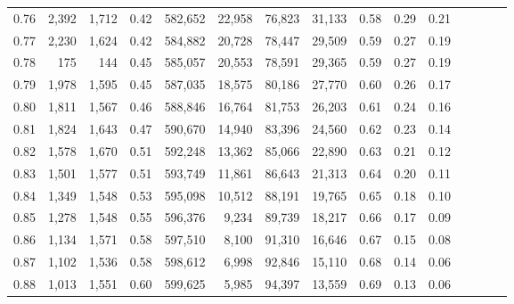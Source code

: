 \begin{tabular}{rrrcrrrrrrrrrrr}
0.76 &   2,392 &  1,712 &                                       0.42 &  582,652 &   22,958 &   76,823 &   31,133 &  0.58 &  0.29 &                         0.21 \\
0.77 &   2,230 &  1,624 &                                       0.42 &  584,882 &   20,728 &   78,447 &   29,509 &  0.59 &  0.27 &                         0.19 \\
0.78 &     175 &    144 &                                       0.45 &  585,057 &   20,553 &   78,591 &   29,365 &  0.59 &  0.27 &                         0.19 \\
0.79 &   1,978 &  1,595 &                                       0.45 &  587,035 &   18,575 &   80,186 &   27,770 &  0.60 &  0.26 &                         0.17 \\
0.80 &   1,811 &  1,567 &                                       0.46 &  588,846 &   16,764 &   81,753 &   26,203 &  0.61 &  0.24 &                         0.16 \\
0.81 &   1,824 &  1,643 &                                       0.47 &  590,670 &   14,940 &   83,396 &   24,560 &  0.62 &  0.23 &                         0.14 \\
0.82 &   1,578 &  1,670 &                                       0.51 &  592,248 &   13,362 &   85,066 &   22,890 &  0.63 &  0.21 &                         0.12 \\
0.83 &   1,501 &  1,577 &                                       0.51 &  593,749 &   11,861 &   86,643 &   21,313 &  0.64 &  0.20 &                         0.11 \\
0.84 &   1,349 &  1,548 &                                       0.53 &  595,098 &   10,512 &   88,191 &   19,765 &  0.65 &  0.18 &                         0.10 \\
0.85 &   1,278 &  1,548 &                                       0.55 &  596,376 &    9,234 &   89,739 &   18,217 &  0.66 &  0.17 &                         0.09 \\
0.86 &   1,134 &  1,571 &                                       0.58 &  597,510 &    8,100 &   91,310 &   16,646 &  0.67 &  0.15 &                         0.08 \\
0.87 &   1,102 &  1,536 &                                       0.58 &  598,612 &    6,998 &   92,846 &   15,110 &  0.68 &  0.14 &                         0.06 \\
0.88 &   1,013 &  1,551 &                                       0.60 &  599,625 &    5,985 &   94,397 &   13,559 &  0.69 &  0.13 &                         0.06 \\

\end{tabular}
